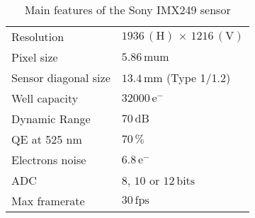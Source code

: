 \begin{table}[!h]
  \centering
  \caption{Main features of the Sony IMX249 sensor}
  \label{tab:IMX249}
  \begin{tabular}{ll}
    \toprule
    Resolution           & $1936\,\mathrm{(H)}\,\times\,1216\,\mathrm{(V)}$                \\
    Pixel size           & $5.86\,\mathrm{mu m}$            \\
    Sensor diagonal size & $13.4\,\mathrm{mm}$ (Type 1/1.2) \\
    Well capacity        & $32000\,\mathrm{e^{-}}$          \\
    Dynamic Range        & $70\,\mathrm{dB}$                \\
    QE at 525 nm         & $70\,\mathrm{\%}$                \\
    Electrons noise      & $6.8\,\mathrm{e^{-}}$            \\
    ADC                  & $8$, $10$ or $12\,\mathrm{bits}$ \\
    Max framerate        & $30\,\mathrm{fps}$               \\
    \bottomrule
  \end{tabular}
\end{table}
